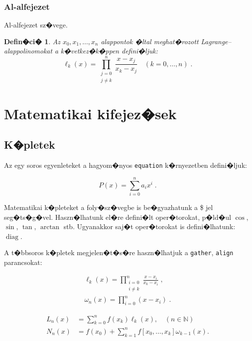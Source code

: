 \documentclass[oneside,11pt,a4paper]{article}
\newtheorem{definition}{Defin�ci�}
\DeclareMathOperator{\diag}{diag}
\newcommand{\IN}{\mathbb{N}}
\begin{document}
\subsubsection{Al-alfejezet}
Al-alfejezet sz�vege.
\begin{definition}
	Az $x_0,x_1,\ldots,x_n$ alappontok �ltal meghat�rozott Lagrange--alappolinomokat a k�vetkez�k�ppen defini�ljuk: 
\[
	\ell_{k}(x)=\prod_{ \substack{ j=0 \\ j \neq k }}^n \frac{x-x_j}{x_k-x_j} \quad (k=0,\ldots,n)\;.
\]
\end{definition}


\section{Matematikai kifejez�sek}

\subsection{K�pletek}

Az egy soros egyenleteket a hagyom�nyos \texttt{equation} k�rnyezetben defini�ljuk:

\begin{equation}
	\label{interpol} %
	P(x)=\sum_{i=0}^{n} a_i x^i \; .
\end{equation}

	Matematikai k�pleteket a foly�sz�vegbe is be�gyazhatunk a \$ jel seg�ts�g�vel. Haszn�lhatunk el�re defini�lt oper�torokat, p�ld�ul $\cos$, $\sin$, $\tan$, $\arctan$ stb. Ugyanakkor saj�t oper�torokat is defini�lhatunk: $\diag$. \par

	A t�bbsoros k�pletek megjelen�t�s�re haszn�lhatjuk a \texttt{gather}, \texttt{align} parancsokat:
	
	\begin{gather}
		\ell_{k}(x)=\prod_{ \substack{ i=0 \\ i \neq k }}^n \frac{x-x_i}{x_k-x_i} \;, \\ 
		\omega_n(x)=\prod_{i=0}^n (x-x_i) \;.
	\end{gather}
	
	\begin{align}
		L_{n}(x) & = \sum_{k=0}^n f(x_k)\ell_k(x), \quad (n\in \IN) \\
		N_{n}(x) & = f(x_0) + \sum_{k=1}^n f[x_0,\ldots,x_k] \omega_{k-1}(x).
	\end{align} 
\end{document}
